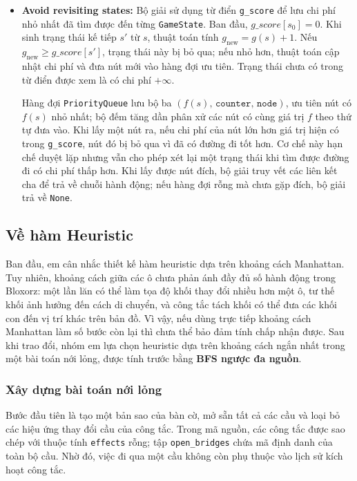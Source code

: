 \begin{itemize}
    Do việc mở sẵn mọi cầu và bỏ hiệu ứng thay đổi cầu không loại bỏ
    đường đi hợp lệ nào của bài toán gốc khi chỉ xét cấu hình khối,
    heuristic không đánh giá quá cao chi phí còn lại, tức là
    $h(s) \leq h^*(s)$. Với mỗi chuyển trạng thái hợp lệ $s \to s'$, ta
    còn có $h(s) \leq 1 + h(s')$. Vì vậy, heuristic có tính chấp nhận
    được và nhất quán, giúp A* tìm lời giải có số hành động ít nhất.

    \item \textbf{Avoid revisiting states:} Bộ giải sử dụng từ điển
    \texttt{g\_score} để lưu chi phí nhỏ nhất đã tìm được đến từng
    \texttt{GameState}. Ban đầu, $g\_score[s_0] = 0$. Khi sinh trạng
    thái kế tiếp $s'$ từ $s$, thuật toán tính $g_{\mathrm{new}} = g(s)+1$.
    Nếu $g_{\mathrm{new}} \geq g\_score[s']$, trạng thái này bị bỏ qua;
    nếu nhỏ hơn, thuật toán cập nhật chi phí và đưa nút mới vào hàng
    đợi ưu tiên. Trạng thái chưa có trong từ điển được xem là có chi
    phí $+\infty$.

    Hàng đợi \texttt{PriorityQueue} lưu bộ ba
    $(f(s),\,\texttt{counter},\,\texttt{node})$, ưu tiên nút có $f(s)$
    nhỏ nhất; bộ đếm tăng dần phân xử các nút có cùng giá trị $f$ theo
    thứ tự đưa vào. Khi lấy một nút ra, nếu chi phí của nút lớn hơn
    giá trị hiện có trong \texttt{g\_score}, nút đó bị bỏ qua vì đã có
    đường đi tốt hơn. Cơ chế này hạn chế duyệt lặp nhưng vẫn cho phép
    xét lại một trạng thái khi tìm được đường đi có chi phí thấp hơn.
    Khi lấy được nút đích, bộ giải truy vết các liên kết cha để trả về
    chuỗi hành động; nếu hàng đợi rỗng mà chưa gặp đích, bộ giải trả
    về \texttt{None}.
\end{itemize}


\subsection{Về hàm Heuristic}
Ban đầu, em cân nhắc thiết kế hàm heuristic dựa trên khoảng cách
Manhattan. Tuy nhiên, khoảng cách giữa các ô chưa phản ánh đầy đủ số
hành động trong Bloxorz: một lần lăn có thể làm tọa độ khối thay đổi
nhiều hơn một ô, tư thế khối ảnh hưởng đến cách di chuyển, và công tắc
tách khối có thể đưa các khối con đến vị trí khác trên bản đồ. Vì vậy,
nếu dùng trực tiếp khoảng cách Manhattan làm số bước còn lại thì chưa
thể bảo đảm tính chấp nhận được. Sau khi trao đổi, nhóm em lựa chọn
heuristic dựa trên khoảng cách ngắn nhất trong một bài toán nới lỏng,
được tính trước bằng \textbf{BFS ngược đa nguồn}.

\subsubsection{Xây dựng bài toán nới lỏng}
Bước đầu tiên là tạo một bản sao của bàn cờ, mở sẵn tất cả các cầu và
loại bỏ các hiệu ứng thay đổi cầu của công tắc. Trong mã nguồn, các
công tắc được sao chép với thuộc tính \texttt{effects} rỗng; tập
\texttt{open\_bridges} chứa mã định danh của toàn bộ cầu. Nhờ đó, việc
đi qua một cầu không còn phụ thuộc vào lịch sử kích hoạt công tắc.

